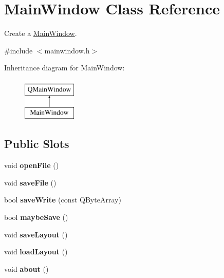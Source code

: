 \hypertarget{class_main_window}{\section{Main\-Window Class Reference}
\label{class_main_window}
}


Create a \hyperlink{class_main_window}{Main\-Window}.  




{\ttfamily \#include $<$mainwindow.\-h$>$}

Inheritance diagram for Main\-Window\-:\begin{figure}[H]
\begin{center}
\leavevmode
\includegraphics[height=2.000000cm]{class_main_window}
\end{center}
\end{figure}
\subsection*{Public Slots}
\begin{DoxyCompactItemize}
\item 
\hypertarget{class_main_window_a288b768c3c21a9171bdc56fe845ece8b}{void {\bfseries open\-File} ()}\label{class_main_window_a288b768c3c21a9171bdc56fe845ece8b}

\item 
\hypertarget{class_main_window_a464aaa4d378e7b2d814756a73d6e1ed6}{void {\bfseries save\-File} ()}\label{class_main_window_a464aaa4d378e7b2d814756a73d6e1ed6}

\item 
\hypertarget{class_main_window_addc822cb332163c0c182630f625732c8}{bool {\bfseries save\-Write} (const Q\-Byte\-Array)}\label{class_main_window_addc822cb332163c0c182630f625732c8}

\item 
\hypertarget{class_main_window_a44eb5d77b382a5acd4b0091f499f4352}{bool {\bfseries maybe\-Save} ()}\label{class_main_window_a44eb5d77b382a5acd4b0091f499f4352}

\item 
\hypertarget{class_main_window_aa00b272a4501c42347c0947579d7cf83}{void {\bfseries save\-Layout} ()}\label{class_main_window_aa00b272a4501c42347c0947579d7cf83}

\item 
\hypertarget{class_main_window_ae7b7947c2627ce667c69e8392f090f78}{void {\bfseries load\-Layout} ()}\label{class_main_window_ae7b7947c2627ce667c69e8392f090f78}

\item 
\hypertarget{class_main_window_a7be6a5d98970ac1a6296c6f9aee1e9bb}{void {\bfseries about} ()}\label{class_main_window_a7be6a5d98970ac1a6296c6f9aee1e9bb}

\end{DoxyCompactItemize}
